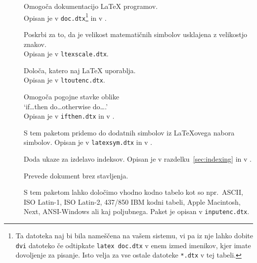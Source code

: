\begin{table}[!hbp]
\caption{Nekaj paketov, ki se namestijo poleg \LaTeX{}a.} \label{packages}
\begin{lined}{11cm}
\begin{description}
\item[\normalfont{}] Omogoča dokumentacijo \LaTeX{} programov.\\
 Opisan je v \texttt{doc.dtx}\footnote{Ta datoteka naj bi bila nameščena na vašem sistemu, 
   vi pa iz nje lahko dobite \texttt{dvi} datoteko
   če odtipkate \texttt{latex doc.dtx} v enem izmed imenikov, kjer imate dovoljenje za pisanje. 
   Isto velja za vse ostale datoteke 
  \texttt{*.dtx} v tej tabeli.}  in v \companion.

\item[\normalfont{}] Poskrbi za to, da je velikost matematičnih simbolov usklajena z velikostjo
  znakov.\\ 
  Opisan je v \texttt{ltexscale.dtx}.

\item[\normalfont{}] Določa, katero 
  naj \LaTeX{} uporablja.\\
  Opisan je v \texttt{ltoutenc.dtx}.

\item[\normalfont{}] Omogoča pogojne stavke oblike \\ 
  `if\ldots then do\ldots otherwise do\ldots.'\\ Opisan je v
  \texttt{ifthen.dtx} in v \companion.

\item[\normalfont{}] S tem paketom pridemo do dodatnih simbolov iz \LaTeX{}ovega nabora simbolov. Opisan je v
  \texttt{latexsym.dtx} in v \companion.
 
\item[\normalfont{}] Doda ukaze za izdelavo indeksov.  
Opisan je v razdelku~\ref{sec:indexing} in v \companion.

\item[\normalfont{}] Prevede dokument brez stavljenja.
  
\item[\normalfont{}] S tem paketom lahko določimo vhodno kodno tabelo kot so 
  npr.~ASCII, ISO Latin-1, ISO Latin-2, 437/850 IBM
  kodni tabeli,  Apple Macintosh, Next, ANSI-Windows ali kaj poljubnega.
  Paket je opisan v \texttt{inputenc.dtx}. 
\end{description}
\end{lined}
\end{table}


